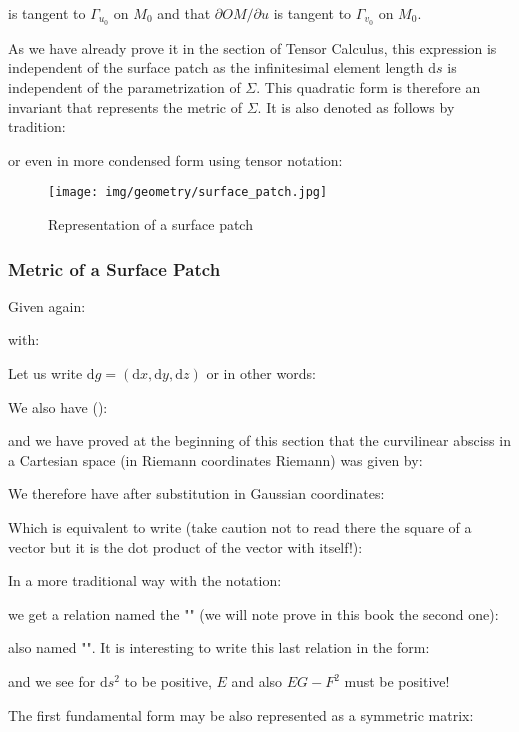 {	is tangent to $\Gamma_{u_0}$ on $M_0$ and that $\partial OM/\partial u$ is tangent to $\Gamma_{v_0}$ on $M_0$.
	
	As we have already prove it in the section of Tensor Calculus, this expression is independent of the surface patch as the infinitesimal  element length $\mathrm{d}s$ is independent of the parametrization of $\Sigma$. This quadratic form is therefore an invariant that represents the metric of $\Sigma$. It is also denoted as follows by tradition:
	
	or even in more condensed form using tensor notation:
	
	
	\begin{figure}[H]
		\centering
		\texttt{[image: img/geometry/surface\_patch.jpg]}
		\caption{Representation of a surface patch}
	\end{figure}
	
	\subsubsection{Metric of a Surface Patch}
	Given again:
	
	with:
	
	Let us write $\mathrm{d}g=(\mathrm{d}x,\mathrm{d}y,\mathrm{d}z)$ or in other words:
	
	We also have ():
	
	and we have proved at the beginning of this section that the curvilinear absciss in a Cartesian space (in Riemann coordinates Riemann) was given by:
	
	We therefore have after substitution in Gaussian coordinates:
	
	Which is equivalent to write (take caution not to read there the square of a vector but it is the dot product of the vector with itself!):
	
	In a more traditional way with the notation:
	
	we get a relation named the "" (we will note prove in this book the second one):
	
	also named "". It is interesting to write this last relation in the form:
	
	and we see for $\mathrm{d}s^2$ to be positive, $E$ and also $EG-F^2$ must be positive!
	
	The first fundamental form may be also represented as a symmetric matrix:
	
}
